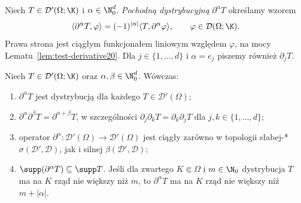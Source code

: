 \begin{definicja}
\label{def:dist-deriv20}
Niech $T\in\mathcal D'(\Omega;\K)$ i $\alpha\in\N_0^d$.
\emph{Pochodną dystrybucyjną} $\partial^\alpha T$ określamy wzorem
\[
 \langle\partial^\alpha T,\varphi\rangle
 =(-1)^{|\alpha|}\langle T,\partial^\alpha\varphi\rangle,
 \qquad\varphi\in\mathcal D(\Omega;\K).
\]
Prawa strona jest ciągłym funkcjonałem liniowym względem $\varphi$,
na mocy Lematu~\ref{lem:test-derivative20}.
Dla $j\in\{1,\ldots,d\}$ i $\alpha=e_j$ piszemy również $\partial_jT$.
\end{definicja}

\begin{twierdzenie}
\label{thm:dist-deriv-cont20}
Niech $T\in\mathcal D'(\Omega;\K)$ oraz
$\alpha,\beta\in\N_0^d$. Wówczas:
\begin{enumerate}
\item $\partial^\alpha T$ jest dystrybucją dla każdego
$T\in\mathcal D'(\Omega)$;
\item $\partial^\alpha\partial^\beta T
=\partial^{\alpha+\beta}T$, w szczególności
$\partial_j\partial_kT=\partial_k\partial_jT$
dla $j,k\in\{1,\ldots,d\}$;
\item operator $\partial^\alpha:\mathcal D'(\Omega)\to
\mathcal D'(\Omega)$ jest ciągły zarówno w topologii słabej-*
$\sigma(\mathcal D',\mathcal D)$, jak i silnej
$\beta(\mathcal D',\mathcal D)$;
\item $\supp(\partial^\alpha T)\subseteq\supp T$.
Jeśli dla zwartego $K\Subset\Omega$ i $m\in\N_0$
dystrybucja $T$ ma na $K$ rząd nie większy niż $m$,
to $\partial^\alpha T$ ma na $K$ rząd nie większy niż
$m+|\alpha|$.
\end{enumerate}
\end{twierdzenie}
